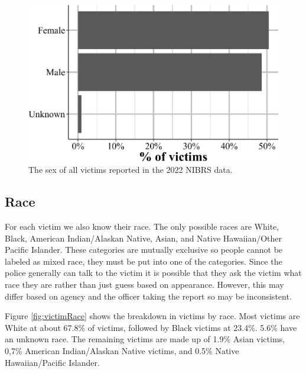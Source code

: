 \documentclass[
  12pt,
  openany]{book}
\begin{document}
\begin{figure}

{\centering \includegraphics[width=0.9\linewidth]{15_nibrs_victim_files/figure-latex/victimSex-1} 

}

\caption{The sex of all victims reported in the 2022 NIBRS data.}\label{fig:victimSex}
\end{figure}

\subsection{Race}\label{race-3}

For each victim we also know their race. The only possible races are White, Black, American Indian/Alaskan Native, Asian, and Native Hawaiian/Other Pacific Islander. These categories are mutually exclusive so people cannot be labeled as mixed race, they must be put into one of the categories. Since the police generally can talk to the victim it is possible that they ask the victim what race they are rather than just guess based on appearance. However, this may differ based on agency and the officer taking the report so may be inconsistent.

Figure \ref{fig:victimRace} shows the breakdown in victims by race. Most victims are White at about 67.8\% of victims, followed by Black victims at 23.4\%. 5.6\% have an unknown race. The remaining victims are made up of 1.9\% Asian victims, 0,7\% American Indian/Alaskan Native victims, and 0.5\% Native Hawaiian/Pacific Islander.
\end{document}
